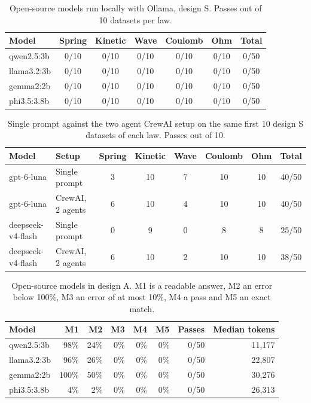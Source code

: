\begin{table}[h]
\centering
\small
\begin{tabular}{lcccccc}
\hline
Model & Spring & Kinetic & Wave & Coulomb & Ohm & Total \\
\hline
qwen2.5:3b & 0/10 & 0/10 & 0/10 & 0/10 & 0/10 & 0/50 \\
llama3.2:3b & 0/10 & 0/10 & 0/10 & 0/10 & 0/10 & 0/50 \\
gemma2:2b & 0/10 & 0/10 & 0/10 & 0/10 & 0/10 & 0/50 \\
phi3.5:3.8b & 0/10 & 0/10 & 0/10 & 0/10 & 0/10 & 0/50 \\
\hline
\end{tabular}
\caption{Open-source models run locally with Ollama, design S. Passes out of 10 datasets per law.}
\label{tab:opensource}
\end{table}

\begin{table}[h]
\centering
\small
\begin{tabular}{llcccccc}
\hline
Model & Setup & Spring & Kinetic & Wave & Coulomb & Ohm & Total \\
\hline
gpt-6-luna & Single prompt & 3 & 10 & 7 & 10 & 10 & 40/50 \\
gpt-6-luna & CrewAI, 2 agents & 6 & 10 & 4 & 10 & 10 & 40/50 \\
deepseek-v4-flash & Single prompt & 0 & 9 & 0 & 8 & 8 & 25/50 \\
deepseek-v4-flash & CrewAI, 2 agents & 6 & 10 & 2 & 10 & 10 & 38/50 \\
\hline
\end{tabular}
\caption{Single prompt against the two agent CrewAI setup on the same first 10 design S datasets of each law. Passes out of 10.}
\label{tab:multiagent}
\end{table}

\begin{table}[h]
\centering
\small
\begin{tabular}{lrrrrrrr}
\hline
Model & M1 & M2 & M3 & M4 & M5 & Passes & Median tokens \\
\hline
qwen2.5:3b & 98\% & 24\% & 0\% & 0\% & 0\% & 0/50 & 11{,}177 \\
llama3.2:3b & 96\% & 26\% & 0\% & 0\% & 0\% & 0/50 & 22{,}807 \\
gemma2:2b & 100\% & 50\% & 0\% & 0\% & 0\% & 0/50 & 30{,}276 \\
phi3.5:3.8b & 4\% & 2\% & 0\% & 0\% & 0\% & 0/50 & 26{,}313 \\
\hline
\end{tabular}
\caption{Open-source models in design A. M1 is a readable answer, M2 an error below 100\%, M3 an error of at most 10\%, M4 a pass and M5 an exact match.}
\label{tab:opensourceA}
\end{table}
